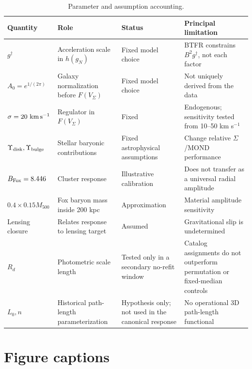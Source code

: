\documentclass[utf8]{FrontiersinHarvard}
\begin{document}
\begin{table}[h!]
\centering
\caption{Parameter and assumption accounting.}\label{tab:parameters}
\scriptsize
\begin{tabularx}{\textwidth}{>{\raggedright\arraybackslash}p{}>{\raggedright\arraybackslash}p{}>{\raggedright\arraybackslash}p{}>{\raggedright\arraybackslash}X}
\toprule
Quantity & Role & Status & Principal limitation \\
\midrule
\(g^\dagger\) & Acceleration scale in \(h(g_N)\) & Fixed model choice & BTFR constrains \(B^2g^\dagger\), not each factor \\
\(A_0=e^{1/(2\pi)}\) & Galaxy normalization before \(F(V_\Sigma)\) & Fixed model choice & Not uniquely derived from the data \\
\(\sigma=20\ {\rm km\,s^{-1}}\) & Regulator in \(F(V_\Sigma)\) & Fixed & Endogenous; sensitivity tested from 10--50 km s\(^{-1}\) \\
\(\Upsilon_{\rm disk},\Upsilon_{\rm bulge}\) & Stellar baryonic contributions & Fixed astrophysical assumptions & Change relative \(\Sigma\)/MOND performance \\
\(B_{\rm Fox}=8.446\) & Cluster response & Illustrative calibration & Does not transfer as a universal radial amplitude \\
\(0.4\times0.15M_{500}\) & Fox baryon mass inside 200 kpc & Approximation & Material amplitude sensitivity \\
Lensing closure & Relates response to lensing target & Assumed & Gravitational slip is undetermined \\
\(R_d\) & Photometric scale length & Tested only in a secondary no-refit window & Catalog assignments do not outperform permutation or fixed-median controls \\
\(L_0,n\) & Historical path-length parameterization & Hypothesis only; not used in the canonical response & No operational 3D path-length functional \\
\bottomrule
\end{tabularx}
\end{table}

\section*{Figure captions}
\end{document}
